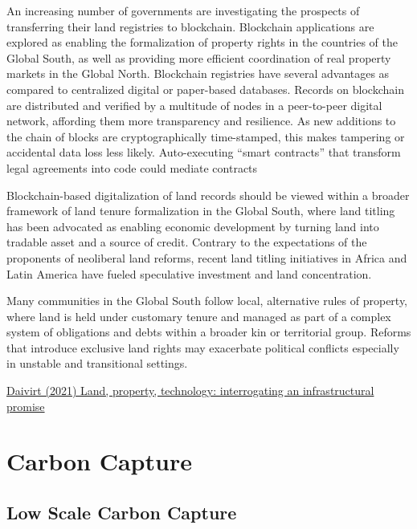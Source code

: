 \documentclass[
]{book}
\begin{document}
An increasing number of governments are investigating the prospects of transferring their land registries to blockchain.
Blockchain applications are explored as enabling the formalization of property rights in the countries of the Global South, as well as providing more efficient coordination of real property markets in the Global North. Blockchain registries have several advantages as compared to centralized digital or paper-based databases. Records on blockchain are distributed and verified by a multitude of nodes in a peer-to-peer digital network, affording them more transparency and resilience. As new additions to the chain of blocks are cryptographically time-stamped, this makes tampering or accidental data loss less likely. Auto-executing ``smart contracts'' that transform legal agreements into code could mediate contracts

Blockchain-based digitalization of land records should be viewed within a broader framework of land tenure formalization in the Global South, where land titling has been advocated as enabling economic development by turning land into tradable asset and a source of credit. Contrary to the expectations of the proponents of neoliberal land reforms, recent land titling initiatives in Africa and Latin America have fueled speculative investment and land concentration.

Many communities in the Global South follow local, alternative rules of property, where land is held under customary tenure and managed as part of a complex system of obligations and debts within a broader kin or territorial group. Reforms that introduce exclusive land rights may exacerbate political conflicts especially in unstable and transitional settings.

\href{https://developingeconomics.org/2021/05/20/land-property-technology-interrogating-an-infrastructural-promise/}{Daivirt (2021) Land, property, technology: interrogating an infrastructural promise}

\hypertarget{carbon-capture}{%
\chapter{Carbon Capture}\label{carbon-capture}}

\hypertarget{low-scale-carbon-capture}{%
\section{Low Scale Carbon Capture}\label{low-scale-carbon-capture}}
\end{document}

